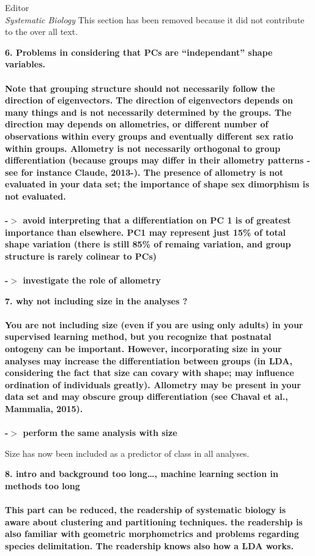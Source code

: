 \documentclass{letter}
\begin{document}
\begin{letter}{Editor \\ \textit{Systematic Biology}}
  This section has been removed because it did not contribute to the over all text.


  \textbf{6. Problems in considering that PCs are ``independant'' shape variables. \\\\
    Note that grouping structure should not necessarily follow the direction of eigenvectors. The direction of eigenvectors depends on many things and is not necessarily determined by the groups. The direction may depends on allometries, or different number of observations within every groups and eventually different sex ratio within groups. Allometry is not necessarily orthogonal to group differentiation (because groups may differ in their allometry patterns - see for instance Claude, 2013-). The presence of allometry is not evaluated in your data set; the importance of shape sex dimorphism is not evaluated. \\\\
    -\(>\) avoid interpreting that a differentiation on PC 1 is of greatest importance than elsewhere. PC1 may represent just 15\% of total shape variation (there is still 85\% of remaing variation, and group structure is rarely colinear to PCs) \\\\
  -\(>\) investigate the role of allometry }


  \textbf{7. why not including size in the analyses ? \\\\
    You are not including size (even if you are using only adults) in your supervised learning method, but you recognize that postnatal ontogeny can be important. However, incorporating size in your analyses may increase the differentiation between groups (in LDA, considering the fact that size can covary with shape; may influence ordination of individuals greatly). Allometry may be present in your data set and may obscure group differentiation (see Chaval et al., Mammalia, 2015). \\\\
  -\(>\) perform the same analysis with size }

  Size has now been included as a predictor of class in all analyses.

  \textbf{8. intro and background too long\ldots, machine learning section in methods too long \\\\
  This part can be reduced, the readership of systematic biology is aware about clustering and partitioning techniques. the readership is also familiar with geometric morphometrics and problems regarding species delimitation. The readership knows also how a LDA works. }


\end{letter}
\end{document}
